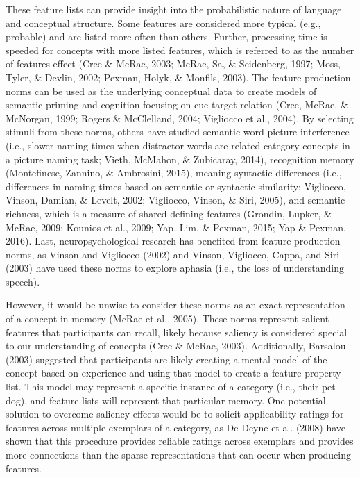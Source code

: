 \documentclass[english,,man]{apa6}
\begin{document}
These feature lists can provide insight into the probabilistic nature of language and conceptual structure. Some features are considered more typical (e.g., probable) and are listed more often than others. Further, processing time is speeded for concepts with more listed features, which is referred to as the number of features effect (Cree \& McRae, 2003; McRae, Sa, \& Seidenberg, 1997; Moss, Tyler, \& Devlin, 2002; Pexman, Holyk, \& Monfils, 2003). The feature production norms can be used as the underlying conceptual data to create models of semantic priming and cognition focusing on cue-target relation (Cree, McRae, \& McNorgan, 1999; Rogers \& McClelland, 2004; Vigliocco et al., 2004). By selecting stimuli from these norms, others have studied semantic word-picture interference (i.e., slower naming times when distractor words are related category concepts in a picture naming task; Vieth, McMahon, \& Zubicaray, 2014), recognition memory (Montefinese, Zannino, \& Ambrosini, 2015), meaning-syntactic differences (i.e., differences in naming times based on semantic or syntactic similarity; Vigliocco, Vinson, Damian, \& Levelt, 2002; Vigliocco, Vinson, \& Siri, 2005), and semantic richness, which is a measure of shared defining features (Grondin, Lupker, \& McRae, 2009; Kounios et al., 2009; Yap, Lim, \& Pexman, 2015; Yap \& Pexman, 2016). Last, neuropsychological research has benefited from feature production norms, as Vinson and Vigliocco (2002) and Vinson, Vigliocco, Cappa, and Siri (2003) have used these norms to explore aphasia (i.e., the loss of understanding speech).

However, it would be unwise to consider these norms as an exact representation of a concept in memory (McRae et al., 2005). These norms represent salient features that participants can recall, likely because saliency is considered special to our understanding of concepts (Cree \& McRae, 2003). Additionally, Barsalou (2003) suggested that participants are likely creating a mental model of the concept based on experience and using that model to create a feature property list. This model may represent a specific instance of a category (i.e., their pet dog), and feature lists will represent that particular memory. One potential solution to overcome saliency effects would be to solicit applicability ratings for features across multiple exemplars of a category, as De Deyne et al. (2008) have shown that this procedure provides reliable ratings across exemplars and provides more connections than the sparse representations that can occur when producing features.
\end{document}
